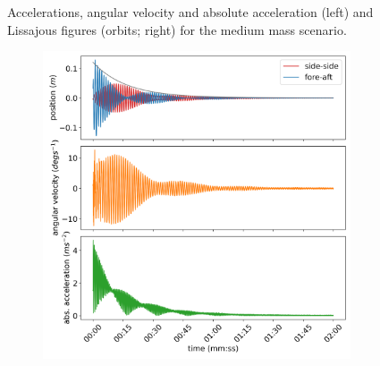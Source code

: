 \documentclass{article}
\begin{document}
\begin{figure}
\begin{subfigure}[b]{0.45\textwidth}
    \end{subfigure}
    
    \caption{Accelerations, angular velocity and absolute acceleration (left) and Lissajous figures (orbits; right) for the medium mass scenario.}
    \label{fig:medium-mass}
\end{figure}


\begin{figure}

    \centering
    \begin{subfigure}[b]{0.45\textwidth}
        \centering
        \includegraphics[width=\textwidth]{figures/high_mass_acceleration.png}
    \end{subfigure}
    \begin{subfigure}[b]{0.45\textwidth}
        \centering

\end{subfigure}
\end{figure}
\end{document}
